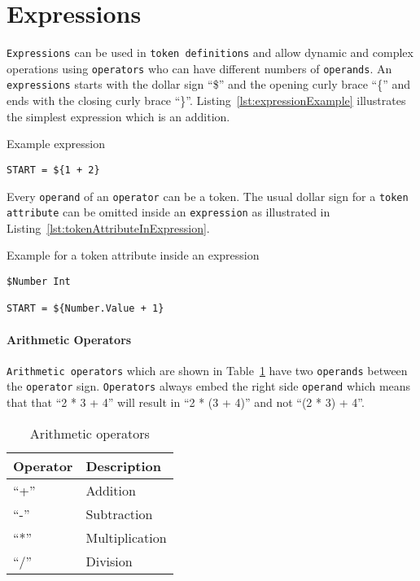 \section{Expressions}
\label{sec:expressions}

\texttt{Expressions} can be used in \texttt{token definitions} and allow dynamic and complex operations using \texttt{operators} who can have different numbers of \texttt{operands}. An \texttt{expressions} starts with the dollar sign \enquote{\$} and the opening curly brace \enquote{\{} and ends with the closing curly brace \enquote{\}}. Listing~\ref{lst:expressionExample} illustrates the simplest expression which is an addition.

\begin{listing}
\caption{Example expression}
\label{lst:expressionExample}
\begin{verbatim}
START = ${1 + 2}
\end{verbatim}
\end{listing}

Every \texttt{operand} of an \texttt{operator} can be a token. The usual dollar sign for a \texttt{token attribute} can be omitted inside an \texttt{expression} as illustrated in Listing~\ref{lst:tokenAttributeInExpression}.

\begin{listing}
\caption{Example for a token attribute inside an expression}
\label{lst:tokenAttributeInExpression}
\begin{verbatim}
$Number Int

START = ${Number.Value + 1}
\end{verbatim}
\end{listing}


\paragraph{Arithmetic Operators}
\label{subsec:arithmeticOperators}

\texttt{Arithmetic operators} which are shown in Table~\ref{table:arithmeticOperators} have two \texttt{operands} between the \texttt{operator} sign. \texttt{Operators} always embed the right side \texttt{operand} which means that that \enquote{2 * 3 + 4} will result in \enquote{2 * (3 + 4)} and not \enquote{(2 * 3) + 4}.

\begin{table}[H]
\caption{Arithmetic operators}
\label{table:arithmeticOperators}
\center
\begin{tabular}{| l | l |}
\hline
  \textbf{Operator}
& \textbf{Description}
\tabularnewline
\hline
  \enquote{+}
& Addition
\tabularnewline
\hline
  \enquote{-}
& Subtraction
\tabularnewline
\hline
  \enquote{*}
& Multiplication
\tabularnewline
\hline
  \enquote{/}
& Division
\tabularnewline
\hline
\end{tabular}
\end{table}

